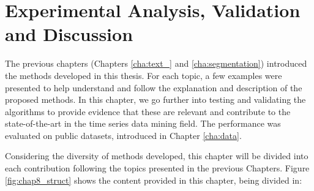 

%

\chapter{Experimental Analysis, Validation and Discussion}
\label{cha:results}

The previous chapters (Chapters \ref{cha:text_} and \ref{cha:segmentation}) introduced the methods developed in this thesis. For each topic, a few examples were presented to help understand and follow the explanation and description of the proposed methods. In this chapter, we go further into testing and validating the algorithms to provide evidence that these are relevant and contribute to the state-of-the-art in the time series data mining field. The performance was evaluated on public datasets, introduced in Chapter \ref{cha:data}.
\par
Considering the diversity of methods developed, this chapter will be divided into each contribution following the topics presented in the previous Chapters. Figure \ref{fig:chap8_struct} shows the content provided in this chapter, being divided in:

